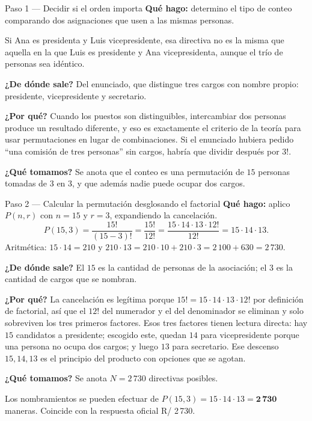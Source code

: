 \documentclass[11pt]{article}
\begin{document}
\begin{paso}{Paso 1 --- Decidir si el orden importa}
\textbf{Qué hago:} determino el tipo de conteo comparando dos asignaciones que usen a las mismas personas.

Si Ana es presidenta y Luis vicepresidente, esa directiva no es la misma que aquella en la que Luis es presidente y Ana vicepresidenta, aunque el trío de personas sea idéntico.

\textbf{¿De dónde sale?} Del enunciado, que distingue tres cargos con nombre propio: presidente, vicepresidente y secretario.

\textbf{¿Por qué?} Cuando los puestos son distinguibles, intercambiar dos personas produce un resultado diferente, y eso es exactamente el criterio de la teoría para usar permutaciones en lugar de combinaciones. Si el enunciado hubiera pedido ``una comisión de tres personas'' sin cargos, habría que dividir después por $3!$.

\textbf{¿Qué tomamos?} Se anota que el conteo es una permutación de $15$ personas tomadas de $3$ en $3$, y que además nadie puede ocupar dos cargos.
\end{paso}

\begin{paso}{Paso 2 --- Calcular la permutación desglosando el factorial}
\textbf{Qué hago:} aplico $P(n,r)$ con $n=15$ y $r=3$, expandiendo la cancelación.
\[
  P(15,3)=\frac{15!}{(15-3)!}=\frac{15!}{12!}
  =\frac{15\cdot 14\cdot 13\cdot 12!}{12!}
  =15\cdot 14\cdot 13 .
\]
Aritmética: $15\cdot 14=210$ y $210\cdot 13=210\cdot 10+210\cdot 3=2\,100+630=2\,730$.

\textbf{¿De dónde sale?} El $15$ es la cantidad de personas de la asociación; el $3$ es la cantidad de cargos que se nombran.

\textbf{¿Por qué?} La cancelación es legítima porque $15!=15\cdot 14\cdot 13\cdot 12!$ por definición de factorial, así que el $12!$ del numerador y el del denominador se eliminan y solo sobreviven los tres primeros factores. Esos tres factores tienen lectura directa: hay $15$ candidatos a presidente; escogido este, quedan $14$ para vicepresidente porque una persona no ocupa dos cargos; y luego $13$ para secretario. Ese descenso $15,14,13$ es el principio del producto con opciones que se agotan.

\textbf{¿Qué tomamos?} Se anota $N=2\,730$ directivas posibles.
\end{paso}

\begin{resp}
Los nombramientos se pueden efectuar de $P(15,3)=15\cdot 14\cdot 13=\mathbf{2\,730}$ maneras. Coincide con la respuesta oficial R/ 2\,730.
\end{resp}
\end{document}
